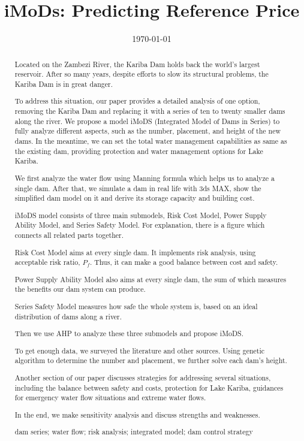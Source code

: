 \documentclass{mcmthesis}
\begin{document}
\linespread{0.6} %
\setlength{\parskip}{0.5\baselineskip} %
\title{iMoDs: Predicting Reference Price }

\date{\today}
	\begin{abstract}

		Located on the Zambezi River, the Kariba Dam holds back the world's largest reservoir. After so many years, despite efforts to slow its structural problems, the Kariba Dam is in great danger.

To address this situation, our paper provides a detailed analysis of one option, removing the Kariba Dam and replacing it with a series of ten to twenty smaller dams along the river. We propose a model iMoDS (Integrated Model of Dams in Series) to fully analyze different aspects, such as the number, placement, and height of the new dams. In the meantime, we can set the total water management capabilities as same as the existing dam, providing protection and water management options for Lake Kariba.

We first analyze the water flow using Manning formula which helps us to analyze a single dam. After that, we simulate a dam in real life with 3ds MAX,  show the simplified dam model on it and derive its storage capacity and building cost.

iMoDS model consists of three main submodels, Risk Cost Model, Power Supply Ability Model, and Series Safety Model. For explanation, there is a figure which connects all related parts together.

Risk Cost Model aims at every single dam. It implements risk analysis, using acceptable risk ratio, $P_f$. Thus, it can make a good balance between cost and safety.

Power Supply Ability Model also aims at every single dam, the sum of which measures the benefits our dam system can produce.

Series Safety Model measures how safe the whole system is, based on an ideal distribution of dams along a river.

Then we use AHP to analyze these three submodels and propose iMoDS.

To get enough data, we surveyed the literature and other sources. Using genetic algorithm to determine the number and placement, we further solve each dam's height.

Another section of our paper discusses strategies for addressing several situations, including the balance between safety and costs, protection for Lake Kariba, guidances for emergency water flow situations and extreme water flows.

In the end, we make sensitivity analysis and discuss strengths and weaknesses.
		\begin{keywords}
			dam series; water flow; risk analysis; integrated model; dam control strategy
		\end{keywords}
	\end{abstract}
\end{document}
